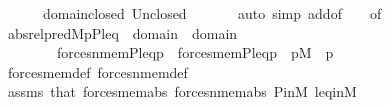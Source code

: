 \begin{isabellebody}
\ \ \ \ \ \ domain{\isacharunderscore}{\kern0pt}closed\ Un{\isacharunderscore}{\kern0pt}closed\ \isanewline
\ \ \ \ \isamarkupfalse%
\ {\isacharparenleft}{\kern0pt}auto\ simp\ add{\isacharcolon}{\kern0pt}{}{\isacharbrackleft}{\kern0pt}of\ {\isacharunderscore}{\kern0pt}\ {\isacharunderscore}{\kern0pt}\ {\isasymtau}{\isacharbrackright}{\kern0pt}\ {}{\isacharbrackleft}{\kern0pt}of\ {\isacharunderscore}{\kern0pt}\ {\isacharunderscore}{\kern0pt}\ {\isasymtheta}{\isacharbrackright}{\kern0pt}{\isacharparenright}{\kern0pt}\isanewline
\ \ \isamarkupfalse%
\ abs{}{\isacharcolon}{\kern0pt}{\isachardoublequoteopen}{\isacharquery}{\kern0pt}rel{\isacharunderscore}{\kern0pt}pred{\isacharparenleft}{\kern0pt}{\isacharhash}{\kern0pt}{\isacharhash}{\kern0pt}M{\isacharcomma}{\kern0pt}p{\isacharcomma}{\kern0pt}P{\isacharcomma}{\kern0pt}leq{\isacharcomma}{\kern0pt}{\isasymtheta}{\isacharcomma}{\kern0pt}{\isasymtau}{\isacharparenright}{\kern0pt}\ {\isasymlongleftrightarrow}\ {\isacharparenleft}{\kern0pt}{\isasymexists}{\isasymsigma}{\isasymin}domain{\isacharparenleft}{\kern0pt}{\isasymtau}{\isacharparenright}{\kern0pt}\ {\isasymunion}\ domain{\isacharparenleft}{\kern0pt}{\isasymtheta}{\isacharparenright}{\kern0pt}{\isachardot}{\kern0pt}\ \isanewline
\ \ \ \ \ \ \ \ forces{\isacharunderscore}{\kern0pt}nmem{\isacharprime}{\kern0pt}{\isacharparenleft}{\kern0pt}P{\isacharcomma}{\kern0pt}leq{\isacharcomma}{\kern0pt}p{\isacharcomma}{\kern0pt}{\isasymsigma}{\isacharcomma}{\kern0pt}{\isasymtau}{\isacharparenright}{\kern0pt}\ {\isasymand}\ forces{\isacharunderscore}{\kern0pt}mem{\isacharprime}{\kern0pt}{\isacharparenleft}{\kern0pt}P{\isacharcomma}{\kern0pt}leq{\isacharcomma}{\kern0pt}p{\isacharcomma}{\kern0pt}{\isasymsigma}{\isacharcomma}{\kern0pt}{\isasymtheta}{\isacharparenright}{\kern0pt}{\isacharparenright}{\kern0pt}{\isachardoublequoteclose}\ \ {\isachardoublequoteopen}p{\isasymin}M{\isachardoublequoteclose}\ \ p\isanewline
\ \ \ \ \isamarkupfalse%
\ forces{\isacharunderscore}{\kern0pt}mem{\isacharunderscore}{\kern0pt}def\ forces{\isacharunderscore}{\kern0pt}nmem{\isacharunderscore}{\kern0pt}def\isanewline
\ \ \ \ \isamarkupfalse%
\ assms\ that\ forces{\isacharunderscore}{\kern0pt}mem{\isacharprime}{\kern0pt}{\isacharunderscore}{\kern0pt}abs\ forces{\isacharunderscore}{\kern0pt}nmem{\isacharprime}{\kern0pt}{\isacharunderscore}{\kern0pt}abs\ P{\isacharunderscore}{\kern0pt}in{\isacharunderscore}{\kern0pt}M\ leq{\isacharunderscore}{\kern0pt}in{\isacharunderscore}{\kern0pt}M\ \isanewline

\end{isabellebody}
